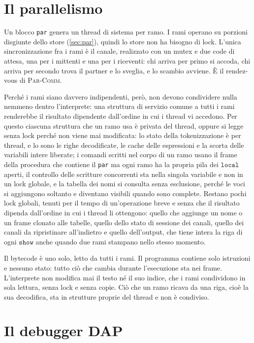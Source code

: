 \section{Il parallelismo}

Un blocco \texttt{par} genera un thread di sistema per ramo. I rami operano su
porzioni disgiunte dello store (\cref{sec:par}), quindi lo store non ha bisogno
di lock. L'unica sincronizzazione fra i rami è il canale, realizzato con un mutex e due code
di attesa, una per i mittenti e una per i riceventi: chi arriva per primo si
accoda, chi arriva per secondo trova il partner e lo sveglia, e lo scambio
avviene. È il rendez-vous di \textsc{Par-Comm}.

Perché i rami siano davvero indipendenti, però, non devono condividere nulla
nemmeno dentro l'interprete: una struttura di servizio comune a tutti i rami
renderebbe il risultato dipendente dall'ordine in cui i thread vi accedono. Per
questo ciascuna struttura che un ramo usa è privata del thread, oppure si legge
senza lock perché non viene mai modificata: lo stato della tokenizzazione è per
thread, e lo sono le righe decodificate, le cache delle espressioni e la
scorta delle variabili intere liberate; i comandi scritti nel corpo di un ramo usano il frame della procedura
che contiene il \texttt{par} ma ogni ramo ha la propria pila dei
$\mathtt{local}$ aperti, il controllo delle scritture concorrenti sta nella singola variabile e
non in un lock globale, e la tabella dei nomi si consulta senza esclusione,
perché le voci si aggiungono soltanto e diventano visibili quando sono complete.
Restano pochi lock globali, tenuti per il tempo di un'operazione breve e senza
che il risultato dipenda dall'ordine in cui i thread li ottengono: quello che
aggiunge un nome o un frame clonato alle tabelle, quello dello stato di
sessione dei canali, quello dei canali da ripristinare all'indietro e quello
dell'output, che tiene intera la riga di ogni $\mathtt{show}$ anche quando due
rami stampano nello stesso momento.

Il bytecode è uno solo, letto da tutti i rami. Il programma contiene solo
istruzioni e nessuno stato: tutto ciò che cambia durante l'esecuzione sta
nei frame. L'interprete non modifica mai il testo né il suo indice, che i rami
condividono in sola lettura, senza lock e senza copie. Ciò che un ramo
ricava da una riga, cioè la sua decodifica, sta in strutture proprie del
thread e non è condiviso.

\section{Il debugger DAP}
\label{sec:dap}

